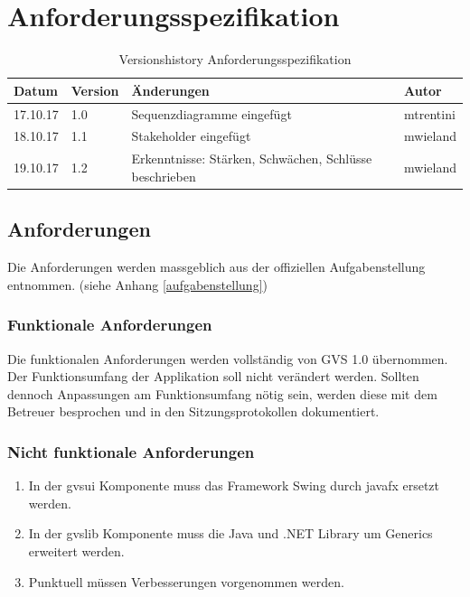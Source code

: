 \documentclass[11pt,a4paper,english,oneside]{book}
\numberwithin{equation}{chapter}
\begin{document}
	
	
	\chapter{Anforderungsspezifikation}
	
	\begin{table}[h!]
		\centering
		\begin{tabularx}{\linewidth}{l l X l}
			\toprule 
			Datum & Version & Änderungen & Autor \\
			\midrule
			17.10.17 & 1.0 & Sequenzdiagramme eingefügt & mtrentini \\
			18.10.17 & 1.1 & Stakeholder eingefügt & mwieland \\
			19.10.17 & 1.2 & Erkenntnisse: Stärken, Schwächen, Schlüsse beschrieben & mwieland \\
			\bottomrule 
		\end{tabularx} 
		\caption{Versionshistory Anforderungsspezifikation} 
	\end{table}
	
	
	
	\section{Anforderungen} \label{sec:functionalreq}
	Die Anforderungen werden massgeblich aus der offiziellen Aufgabenstellung entnommen. (siehe Anhang \ref{aufgabenstellung})
	
	\subsection{Funktionale Anforderungen}
	Die funktionalen Anforderungen werden vollständig von GVS 1.0 \cite{gvs1} übernommen. Der Funktionsumfang der Applikation soll nicht verändert werden. Sollten dennoch Anpassungen am Funktionsumfang nötig sein, werden diese mit dem Betreuer besprochen und in den Sitzungsprotokollen dokumentiert.
	
	\subsection{Nicht funktionale Anforderungen}
	
	\begin{enumerate}
		\item In der \gls{gvsui} Komponente muss das Framework Swing durch \gls{javafx} ersetzt werden.
		\item In der \gls{gvslib} Komponente muss die Java und .NET Library um Generics erweitert werden. 
		\item Punktuell müssen Verbesserungen vorgenommen werden.
	\end{enumerate}
\end{document}
